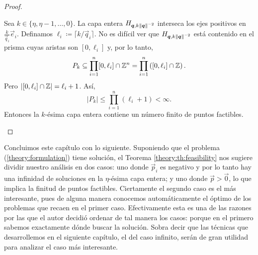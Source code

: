 \begin{proof}
\begin{enumerate}
			Sea $k \in \lbrace \eta, \eta - 1, \ldots, 0 \rbrace$. La capa entera $H_{\boldsymbol{q},
			k\left\lVert \boldsymbol{q} \right\rVert^{-2}}$ interseca los ejes positivos en $\frac{k}{\vec{q}_i}\vec{e}_i$.
			Definamos $\ell_i \coloneq \lceil k/\vec{q}_i \rceil$. No es difícil ver que
			$H_{\boldsymbol{q}, k\left\lVert \boldsymbol{q} \right\rVert^{-2}}$ está contenido en el prisma cuyas aristas son $[0,
			\ell_i]$ y, por lo tanto,
			\begin{equation*}
				P_k \subseteq \prod_{i = 1}^{n} [0, \ell_i] \cap \mathbb{Z}^n = \prod_{i = 1}^{n}
				\left( [0, \ell_i] \cap \mathbb{Z} \right).
			\end{equation*}
			Pero $\left| [0, \ell_i] \cap \mathbb{Z} \right| = \ell_i + 1$. Así,
			\begin{equation*}
				|P_k| \leq \prod_{i = 1}^{n} (\ell_i + 1) < \infty.
			\end{equation*}
			Entonces la $k$-ésima capa entera contiene un número finito de puntos factibles.
	\end{enumerate}
\end{proof}
Concluimos este capítulo con lo siguiente. Suponiendo que el problema (\ref{theory:formulation})
tiene solución, el Teorema \ref{theory:th:feasibility} nos sugiere dividir nuestro análisis en dos
casos: uno donde $\vec{p}_i$ es negativo y por lo tanto hay una infinidad de soluciones en la
$\eta$-ésima capa entera; y uno donde $\vec{p} > \vec{0}$, lo que implica la finitud de puntos
factibles. Ciertamente el segundo caso es el más interesante, pues de alguna manera conocemos
automáticamente el óptimo de los problemas que recaen en el primer caso. Efectivamente esta es una
de las razones por las que el autor decidió ordenar de tal manera los casos: porque en el primero
sabemos exactamente dónde buscar la solución. Sobra decir que las técnicas que desarrollemos en el
siguiente capítulo, el del caso infinito, serán de gran utilidad para analizar el caso más
interesante.

